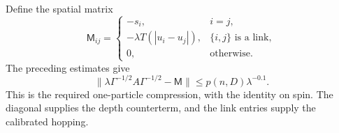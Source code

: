 Define the spatial matrix
\[
 \mathsf M_{ij}=\begin{cases}
  -s_i,&i=j,\\
  -\lambda T(|u_i-u_j|),&\{i,j\}\text{ is a link},\\
  0,&\text{otherwise}.
 \end{cases}
\]
The preceding estimates give
\[
 \bigl\|\lambda\Gamma^{-1/2}A\Gamma^{-1/2}-\mathsf M\bigr\|
       \le p(n,D)\lambda^{-0.1}.
\]
This is the required one-particle compression, with the identity on
spin. The diagonal supplies the depth counterterm, and the link
entries supply the calibrated hopping.

